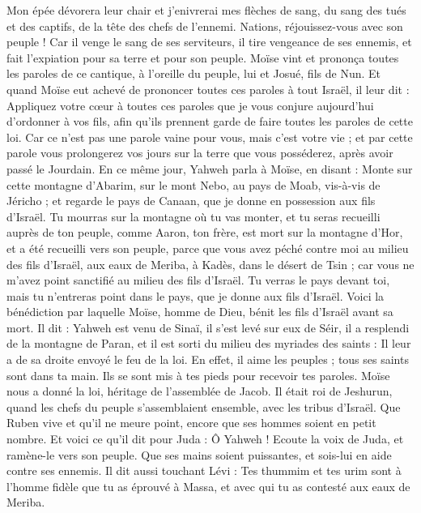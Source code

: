 \begin{multicols}{2}
Mon épée dévorera leur chair et j'enivrerai mes flèches de sang, du sang des tués et des captifs, de la tête des chefs de l’ennemi.
Nations, réjouissez-vous avec son peuple ! Car il venge le sang de ses serviteurs, il tire vengeance de ses ennemis, et fait l'expiation pour sa terre et pour son peuple.
Moïse vint et prononça toutes les paroles de ce cantique, à l’oreille du peuple, lui et Josué, fils de Nun.
Et quand Moïse eut achevé de prononcer toutes ces paroles à tout Israël,
il leur dit : Appliquez votre cœur à toutes ces paroles que je vous conjure aujourd'hui d’ordonner à vos fils, afin qu'ils prennent garde de faire toutes les paroles de cette loi.
Car ce n'est pas une parole vaine pour vous, mais c'est votre vie ; et par cette parole vous prolongerez vos jours sur la terre que vous posséderez, après avoir passé le Jourdain.
En ce même jour, Yahweh parla à Moïse, en disant :
Monte sur cette montagne d’Abarim, sur le mont Nebo, au pays de Moab, vis-à-vis de Jéricho ; et regarde le pays de Canaan, que je donne en possession aux fils d'Israël.
Tu mourras sur la montagne où tu vas monter, et tu seras recueilli auprès de ton peuple, comme Aaron, ton frère, est mort sur la montagne d'Hor, et a été recueilli vers son peuple,
parce que vous avez péché contre moi au milieu des fils d'Israël, aux eaux de Meriba, à Kadès, dans le désert de Tsin ; car vous ne m'avez point sanctifié au milieu des fils d'Israël.
Tu verras le pays devant toi, mais tu n’entreras point dans le pays, que je donne aux fils d'Israël.
\VerseOne{}Voici la bénédiction par laquelle Moïse, homme de Dieu, bénit les fils d'Israël avant sa mort.
Il dit : Yahweh est venu de Sinaï, il s'est levé sur eux de Séir, il a resplendi de la montagne de Paran, et il est sorti du milieu des myriades des saints : Il leur a de sa droite envoyé le feu de la loi.
En effet, il aime les peuples ; tous ses saints sont dans ta main. Ils se sont mis à tes pieds pour recevoir tes paroles.
Moïse nous a donné la loi, héritage de l'assemblée de Jacob.
Il était roi de Jeshurun\FTNT{}, quand les chefs du peuple s’assemblaient ensemble, avec les tribus d'Israël.
Que Ruben vive et qu'il ne meure point, encore que ses hommes soient en petit nombre.
Et voici ce qu’il dit pour Juda : Ô Yahweh ! Ecoute la voix de Juda, et ramène-le vers son peuple. Que ses mains soient puissantes, et sois-lui en aide contre ses ennemis.
Il dit aussi touchant Lévi : Tes thummim et tes urim sont à l'homme fidèle que tu as éprouvé à Massa, et avec qui tu as contesté aux eaux de Meriba.

\end{multicols}
